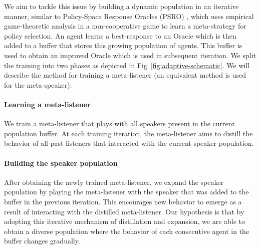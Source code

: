 \documentclass{article}
\begin{document}
We aim to tackle this issue by building a dynamic population in an iterative manner, similar to Policy-Space Response Oracles (PSRO) \citep{NIPS2017_3323fe11}, which uses empirical game-theoretic analysis in a non-cooperative game to learn a meta-strategy for policy selection. An agent learns a best-response to an Oracle which is then added to a buffer that stores this growing population of agents. This buffer is used to obtain an improved Oracle which is used in subsequent iteration. We split the training into two phases as depicted in Fig~\ref{fig:adaptive-schematic}. We will describe the method for training a meta-listener (an equivalent method is used for the meta-speaker):

\paragraph{Learning a meta-listener}
We train a meta-listener that plays with all speakers present in the current population buffer. At each training iteration, the meta-listener aims to distill the behavior of all past listeners that interacted with the current speaker population.

\paragraph{Building the speaker population}
After obtaining the newly trained meta-listener, we expand the speaker population by playing the meta-listener with the speaker that was added to the buffer in the previous iteration. This encourages new behavior to emerge as a result of interacting with the distilled meta-listener. Our hypothesis is that by adopting this iterative mechanism of distillation and expansion, we are able to obtain a diverse population where the behavior of each consecutive agent in the buffer changes gradually.
\end{document}
